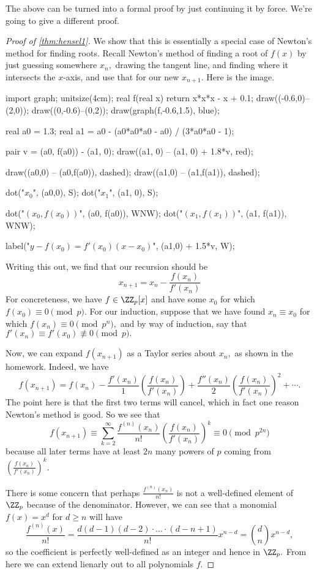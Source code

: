The above can be turned into a formal proof by just continuing it by force. We're going to give a different proof.
\begin{proof}[Proof of \autoref{thm:hensel1}]
	We show that this is essentially a special case of Newton's method for finding roots. Recall Newton's method of finding a root of $f(x)$ by just guessing somewhere $x_n,$ drawing the tangent line, and finding where it intersects the $x$-axis, and use that for our new $x_{n+1}.$ Here is the image.
	\begin{center}
		\begin{asy}
			import graph;
			unitsize(4cm);
			real f(real x)
			{
				return x*x*x - x + 0.1;
			}
			draw((-0.6,0)--(2,0)); draw((0,-0.6)--(0,2));
			draw(graph(f,-0.6,1.5), blue);

			real a0 = 1.3;
			real a1 = a0 - (a0*a0*a0 - a0) / (3*a0*a0 - 1);

			pair v = (a0, f(a0)) - (a1, 0);
			draw((a1, 0) -- (a1, 0) + 1.8*v, red);

			draw((a0,0) -- (a0,f(a0)), dashed);
			draw((a1,0) -- (a1,f(a1)), dashed);

			dot("$x_0$", (a0,0), S); dot("$x_1$", (a1, 0), S);

			dot("$(x_0,f(x_0))$", (a0, f(a0)), WNW);
			dot("$(x_{1},f(x_{1}))$", (a1, f(a1)), WNW);

			label("\color{red}$y-f(x_0)=f'(x_0)(x-x_0)$", (a1,0) + 1.5*v, W);
		\end{asy}
	\end{center}
	Writing this out, we find that our recursion should be
	\[x_{n+1}=x_n-\frac{f(x_n)}{f'(x_n)}\]
	For concreteness, we have $f\in\ZZ_p[x]$ and have some $x_0$ for which $f(x_0)\equiv0\pmod p.$ For our induction, suppose that we have found $x_n\equiv x_0$ for which $f(x_n)\equiv0\pmod{p^n},$ and by way of induction, say that $f'(x_n)\equiv f'(x_0)\not\equiv0\pmod p.$

	Now, we can expand $f(x_{n+1})$ as a Taylor series about $x_n,$ as shown in the homework. Indeed, we have
	\[f(x_{n+1})=f(x_n)-\frac{f'(x_n)}1\left(\frac{f(x_n)}{f'(x_n)}\right)+\frac{f''(x_n)}2\left(\frac{f(x_n)}{f'(x_n)}\right)^2+\cdots.\]
	The point here is that the first two terms will cancel, which in fact one reason Newton's method is good. So we see that
	\[f(x_{n+1})\equiv\sum_{k=2}^\infty\frac{f^{(n)}(x_n)}{n!}\left(\frac{f(x_n)}{f'(x_n)}\right)^k\equiv0\pmod{p^{2n}}\]
	because all later terms have at least $2n$ many powers of $p$ coming from $\left(\frac{f(x_n)}{f'(x_n)}\right)^k.$
	
	There is some concern that perhaps $\frac{f^{(n)}(x_n)}{n!}$ is not a well-defined element of $\ZZ_p$ because of the denominator. However, we can see that a monomial $f(x)=x^d$ for $d\ge n$ will have
	\[\frac{f^{(n)}(x)}{n!}=\frac{d(d-1)(d-2)\cdot\ldots\cdot(d-n+1)}{n!}x^{n-d}=\binom dnx^{n-d},\]
	so the coefficient is perfectly well-defined as an integer and hence in $\ZZ_p.$ From here we can extend lienarly out to all polynomials $f.$
\end{proof}
